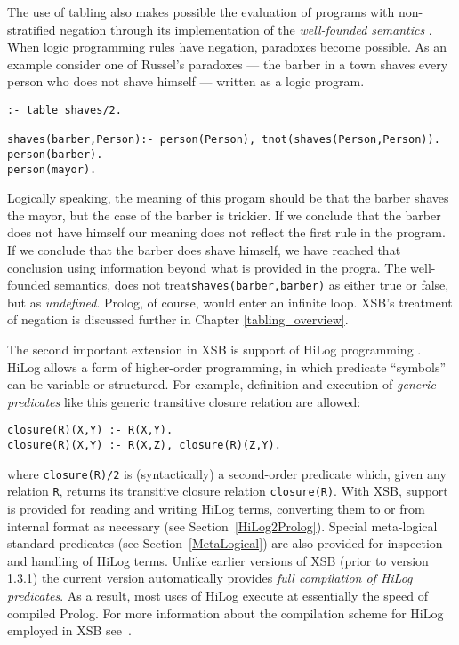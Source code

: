 The use of tabling also makes possible the evaluation of programs with
non-stratified negation through its implementation of the {\em
well-founded semantics} \cite{VGRS91}.  When logic programming rules
have negation, paradoxes become possible.  As an example consider one
of Russel's paradoxes --- 
the barber in a town shaves every person who does not shave himself ---
written as a logic program.
\begin{center}
\begin{verbatim} 
:- table shaves/2.

shaves(barber,Person):- person(Person), tnot(shaves(Person,Person)).
person(barber).
person(mayor).
\end{verbatim} 
\end{center}
Logically speaking, the meaning of this progam should be that the
barber shaves 
the mayor, but the case of the barber is trickier.  If we conclude
that the barber does not have himself our meaning does not reflect the 
first rule in the program.  If we conclude that the barber does shave
himself, we have reached that conclusion using information beyond what 
is provided in the progra.  The well-founded semantics, does not
treat{\tt shaves(barber,barber)} as either true or false, but as {\em
undefined}. 
Prolog, of course, would enter an infinite loop.  XSB's treatment of
negation is discussed further in Chapter \ref{tabling_overview}.

The second important extension in XSB is support of HiLog
programming \cite{ChKW93,SaWa95}.  HiLog allows a form of 
higher-order programming, in
which predicate ``symbols'' can be variable or structured.  For example,
definition and execution of {\em generic predicates} like this generic
transitive closure relation are allowed:
\begin{center}
\begin{minipage}{3.7in}
\begin{verbatim}
closure(R)(X,Y) :- R(X,Y).
closure(R)(X,Y) :- R(X,Z), closure(R)(Z,Y).
\end{verbatim}
\end{minipage}
\end{center}
where {\tt closure(R)/2} is (syntactically) a second-order predicate
which, given any relation {\tt R}, returns its transitive closure
relation {\tt closure(R)}.  With XSB, support is provided for reading and
writing HiLog terms, converting them to or from internal format as
necessary (see Section~\ref{HiLog2Prolog}).  Special meta-logical
standard predicates (see Section~\ref{MetaLogical}) are also provided
for inspection and handling of HiLog terms.  Unlike earlier versions
of XSB (prior to version 1.3.1) the current version automatically
provides {\em full compilation of HiLog predicates}.  As a result,
most uses of HiLog execute at essentially the speed of compiled
Prolog.  For more information about the compilation scheme for HiLog
employed in XSB see~\cite{SaWa95}.

